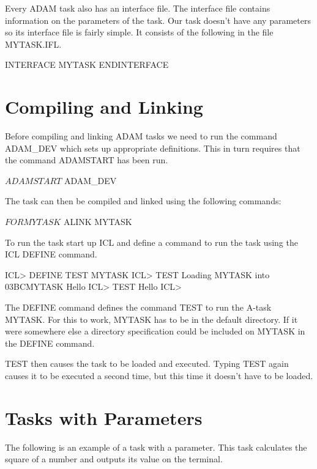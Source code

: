 \documentclass[twoside,11pt,nolof,chapters]{starlink}
\begin{document}
Every ADAM task also has an interface file. The interface file contains
information on the parameters of the task. Our task doesn't have any parameters
so its interface file is fairly simple. It consists of the following in
the file MYTASK.IFL.

\begin{terminalv}
    INTERFACE MYTASK
    ENDINTERFACE
\end{terminalv}

\section{Compiling and Linking}

Before compiling and linking ADAM tasks we need to run the command ADAM\_DEV
which sets up appropriate definitions. This in turn requires
that the command ADAMSTART has been run.

\begin{terminalv}
    $ ADAMSTART
    $ ADAM_DEV
\end{terminalv}

The task can then be compiled and linked using the following commands:

\begin{terminalv}
    $ FOR MYTASK
    $ ALINK MYTASK
\end{terminalv}

To run the task start up ICL and define a command to run the task using
the ICL DEFINE command.

\begin{terminalv}
    ICL> DEFINE  TEST  MYTASK
    ICL> TEST
    Loading MYTASK into 03BCMYTASK
    Hello
    ICL> TEST
    Hello
    ICL>
\end{terminalv}
The DEFINE command defines the command TEST to run the A-task MYTASK. For
this to work, MYTASK has to be in the default directory. If it were somewhere
else a directory specification could be included on MYTASK in the DEFINE
command.

TEST then causes the task to be loaded and executed. Typing TEST again causes
it to be executed a second time, but this time it doesn't have to be loaded.

\section{Tasks with Parameters}

The following is an example of a task with a parameter. This task calculates
the square of a number and outputs its value on the terminal.
\end{document}
